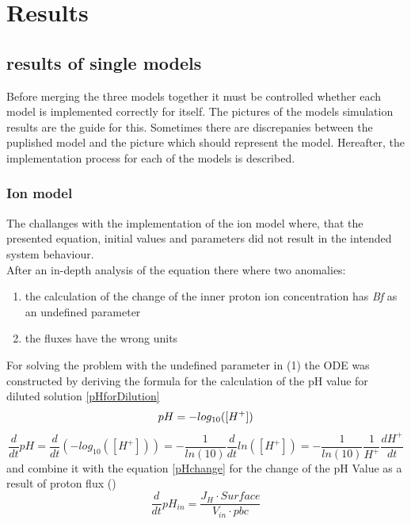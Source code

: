 \section{Results}
\subsection{results of single models}
Before merging the three models together it must be controlled whether each model is implemented correctly for itself. The pictures of the models simulation results are the guide for this. Sometimes there are discrepanies between the puplished model and the picture which should represent the model.  Hereafter, the implementation process for each of the models is described.

\subsubsection{Ion model}
The challanges with the implementation of the ion model where, that the presented equation, initial values and parameters did not result in the intended system behaviour. \\
After an in-depth analysis of the equation there where two anomalies:

\begin{enumerate}
	\item the calculation of the change of the inner proton ion concentration has \emph{Bf} as an undefined parameter
	\item the fluxes have the wrong units
\end{enumerate}
For solving the problem with the undefined parameter in (1) the ODE was constructed by deriving the formula for the calculation of the pH value for diluted solution \ref{pHforDilution}
\begin{equation*}
	pH = - log_{10}([H^+])\\
\end{equation*}
\begin{equation}\label{pHforDilution}
	\frac{d}{dt}pH = \frac{d}{dt}(-log_{10}([H^+])) = - \frac{1}{ln(10)} \frac{d}{dt}ln([H^+]) = - \frac{1}{ln(10)}\frac{1}{H^+} \frac{dH^+}{dt}
\end{equation}
and combine it with the equation \ref{pHchange} for the change of the pH Value as a result of proton flux (\cite{martinafroehlich})
\begin{equation}\label{pHchange}
	\frac{d}{dt}pH_{in} = \frac{J_H \cdot Surface}{V_{in} \cdot pbc}
\end{equation}
	
